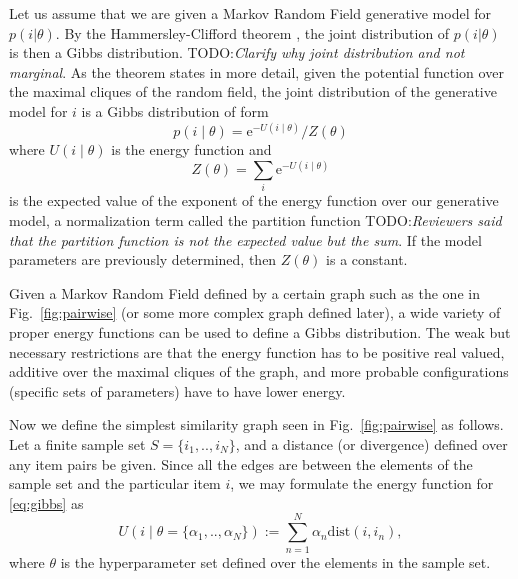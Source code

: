 Let us assume that we are given a Markov Random Field generative model for $p (i|\theta)$.
By the Hammersley-Clifford theorem \cite{hammersley1971markov}, the joint distribution of $p (i|\theta)$ is then a Gibbs distribution. TODO:\textit{Clarify why joint distribution and not marginal}.
As the theorem states in more detail, given the potential function over the maximal cliques of the random field, the joint distribution of the generative model for $i$ is a Gibbs distribution of form
%
\begin{equation}
    p(i \mid \theta) = {\mathrm{e}^{-U(i\mid \theta)}}/{Z(\theta)}
    \label{eq:gibbs}
\end{equation}
%
where $U(i\mid \theta)$ is the energy function and 
%
\begin{equation}
Z(\theta) = \sum_{i} \mathrm{e}^{-U(i \mid \theta)}
\nonumber
\end{equation}
%
is the expected value of the exponent of the energy function over our generative model, a normalization term called the partition function TODO:\textit{Reviewers said that the partition function is not the expected value but the sum}. If the model parameters are previously determined, then $Z(\theta)$ is a constant. 

Given a Markov Random Field defined by a certain graph such as the one in Fig.~\ref{fig:pairwise} (or some more complex graph defined later), a wide variety of proper energy functions can be used to define a Gibbs distribution. The weak but necessary restrictions are that the energy function has to be positive real valued, additive over the maximal cliques of the graph, and more probable configurations (specific sets of parameters) have to have lower energy. 

Now we define the simplest similarity graph seen in Fig.~\ref{fig:pairwise} as follows.  Let a finite sample set $S=\{i_1,..,i_{N}\}$, and a distance (or divergence) defined over any item pairs be given.  Since all the edges are between the elements of the sample set and the particular item $i$, we may formulate the energy function for \eqref{eq:gibbs} as
%
\begin{equation}
U(i \mid \theta=\{\alpha_1,..,\alpha_{N}\}) := \sum_{n=1}^{N} \alpha_n \mbox{dist}(i,i_n),
\label{eq:potential}
\end{equation}
where $\theta$ is the hyperparameter set defined over the elements in the sample set. 


